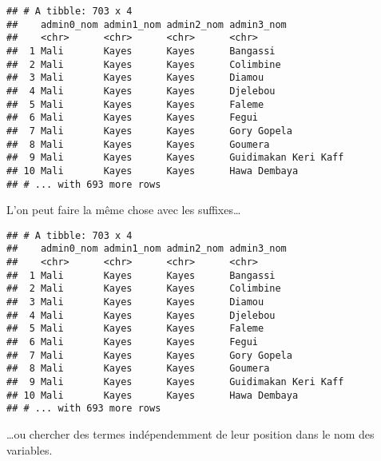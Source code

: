 \documentclass[]{book}
\newenvironment{Shaded}{\begin{snugshade}}{\end{snugshade}}
\newcommand{\KeywordTok}[1]{\textcolor[rgb]{0.13,0.29,0.53}{\textbf{#1}}}
\newcommand{\DecValTok}[1]{\textcolor[rgb]{0.00,0.00,0.81}{#1}}
\newcommand{\StringTok}[1]{\textcolor[rgb]{0.31,0.60,0.02}{#1}}
\newcommand{\OperatorTok}[1]{\textcolor[rgb]{0.81,0.36,0.00}{\textbf{#1}}}
\newcommand{\NormalTok}[1]{#1}
\begin{document}
\begin{verbatim}
## # A tibble: 703 x 4
##    admin0_nom admin1_nom admin2_nom admin3_nom          
##    <chr>      <chr>      <chr>      <chr>               
##  1 Mali       Kayes      Kayes      Bangassi            
##  2 Mali       Kayes      Kayes      Colimbine           
##  3 Mali       Kayes      Kayes      Diamou              
##  4 Mali       Kayes      Kayes      Djelebou            
##  5 Mali       Kayes      Kayes      Faleme              
##  6 Mali       Kayes      Kayes      Fegui               
##  7 Mali       Kayes      Kayes      Gory Gopela         
##  8 Mali       Kayes      Kayes      Goumera             
##  9 Mali       Kayes      Kayes      Guidimakan Keri Kaff
## 10 Mali       Kayes      Kayes      Hawa Dembaya        
## # ... with 693 more rows
\end{verbatim}

L'on peut faire la même chose avec les suffixes\ldots{}

\begin{Shaded}
\end{Shaded}

\begin{verbatim}
## # A tibble: 703 x 4
##    admin0_nom admin1_nom admin2_nom admin3_nom          
##    <chr>      <chr>      <chr>      <chr>               
##  1 Mali       Kayes      Kayes      Bangassi            
##  2 Mali       Kayes      Kayes      Colimbine           
##  3 Mali       Kayes      Kayes      Diamou              
##  4 Mali       Kayes      Kayes      Djelebou            
##  5 Mali       Kayes      Kayes      Faleme              
##  6 Mali       Kayes      Kayes      Fegui               
##  7 Mali       Kayes      Kayes      Gory Gopela         
##  8 Mali       Kayes      Kayes      Goumera             
##  9 Mali       Kayes      Kayes      Guidimakan Keri Kaff
## 10 Mali       Kayes      Kayes      Hawa Dembaya        
## # ... with 693 more rows
\end{verbatim}

\ldots{}ou chercher des termes indépendemment de leur position dans le
nom des variables.

\begin{Shaded}
\end{Shaded}
\end{document}
